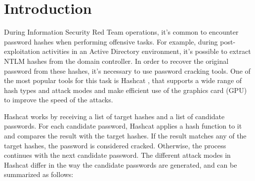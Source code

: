 \documentclass[sigconf,authordraft]{acmart}
\begin{document}


\maketitle

\section{Introduction}
During Information Security Red Team operations, it's common to encounter password hashes when performing offensive tasks.
For example, during post-exploitation activities in an Active Directory environment, it's possible to extract NTLM hashes from the domain controller.
In order to recover the original password from these hashes, it's necessary to use password cracking tools.
One of the most popular tools for this task is Hashcat \cite{hashcat},
that supports a wide range of hash types and attack modes and make efficient use of the graphics card (GPU) to improve the speed of the attacks.

Hashcat works by receiving a list of target hashes and a list of candidate passwords.
For each candidate password, Hashcat applies a hash function to it and compares the result with the target hashes.
If the result matches any of the target hashes, the password is considered cracked.
Otherwise, the process continues with the next candidate password.
The different attack modes in Hashcat differ in the way the candidate passwords are generated, and can be summarized as follows:
\end{document}
